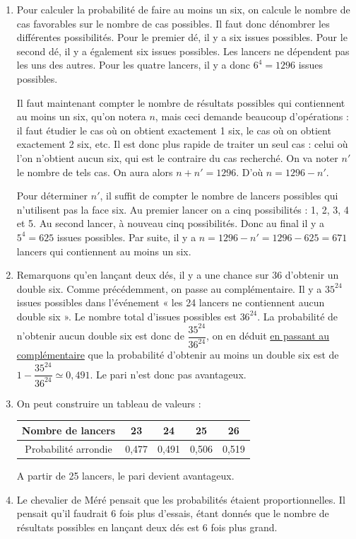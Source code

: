 \documentclass[frenchb]{article}
\begin{document}
\begin{enumerate}
\item Pour calculer la probabilité de faire au moins un six, on calcule le nombre de cas favorables sur le nombre de cas possibles. Il faut donc dénombrer les différentes possibilités. Pour le premier dé, il y a six issues possibles. Pour le second dé, il y a également six issues possibles. Les lancers ne dépendent pas les uns des autres. Pour les quatre lancers, il y a donc $6^4 = 1296$ issues possibles.

Il faut maintenant compter le nombre de résultats possibles qui contiennent au moins un six, qu'on notera $n$, mais ceci demande beaucoup d'opérations : il faut étudier le cas où on obtient exactement 1 six, le cas où on obtient exactement 2 six, etc. Il est donc plus rapide de traiter un seul cas : celui où l'on n'obtient aucun six, qui est le contraire du cas recherché. On va noter $n'$ le nombre de tels cas. On aura alors $n + n' = 1296$. D'où $n = 1296 - n'$.

Pour déterminer $n'$, il suffit de compter le nombre de lancers possibles qui n'utilisent pas la face six. Au premier lancer on a cinq possibilités : 1, 2, 3, 4 et 5. Au second lancer, à nouveau cinq possibilités. Donc au final il y a $5^4 = 625$ issues possibles. Par suite, il y a $n = 1296 - n' = 1296 - 625 = 671$ lancers qui contiennent au moins un six.

\item Remarquons qu'en lançant deux dés, il y a une chance sur 36 d'obtenir un double six. Comme précédemment, on passe au complémentaire. Il y a $35^{24}$ issues possibles dans l'événement « les 24 lancers ne contiennent aucun double six ». Le nombre total d'issues possibles est $36^{24}$. La probabilité de n'obtenir aucun double six est donc de $\dfrac{35^{24}}{36^{24}}$, on en déduit \underline{en passant au complémentaire} que la probabilité d'obtenir au moins un double six est de $1 - \dfrac{35^{24}}{36^{24}} \simeq 0,491$. Le pari n'est donc pas avantageux.

\item On peut construire un tableau de valeurs :

\begin{center}
\begin{tabular}{ |c|c|c|c|c| } 
 \hline
Nombre de lancers & 23 & 24 & 25 & 26 \\
 \hline
Probabilité arrondie & 0,477 & 0,491 & 0,506 & 0,519 \\
 \hline
\end{tabular}
\end{center}

A partir de 25 lancers, le pari devient avantageux.

\item Le chevalier de Méré pensait que les probabilités étaient proportionnelles. Il pensait qu'il faudrait 6 fois plus d'essais, étant donnés que le nombre de résultats possibles en lançant deux dés est 6 fois plus grand.
\end{enumerate}
\end{document}
